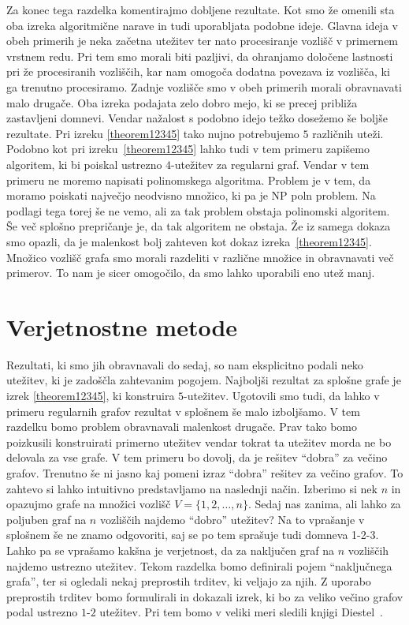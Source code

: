 \documentclass[12pt,a4paper,twoside]{article}
\theoremstyle{definition} %
\theoremstyle{plain} %
\numberwithin{equation}{section}  %
\begin{document}
Za konec tega razdelka komentirajmo dobljene rezultate. Kot smo že omenili sta oba izreka algoritmične narave in tudi uporabljata podobne ideje. Glavna ideja v obeh primerih je neka začetna utežitev ter nato procesiranje vozlišč v primernem vrstnem redu. Pri tem smo morali biti pazljivi, da ohranjamo določene lastnosti pri že procesiranih vozliščih, kar nam omogoča dodatna povezava iz vozlišča, ki ga trenutno procesiramo. Zadnje vozlišče smo v obeh primerih morali obravnavati malo drugače. Oba izreka podajata zelo dobro mejo, ki se precej približa zastavljeni domnevi. Vendar nažalost s podobno idejo težko dosežemo še boljše rezultate. Pri izreku \ref{theorem12345} tako nujno potrebujemo $5$ različnih uteži. Podobno kot pri izreku~\ref{theorem12345} lahko tudi v tem primeru zapišemo algoritem, ki bi poiskal ustrezno $4$-utežitev za regularni graf. Vendar v tem primeru ne moremo napisati polinomskega algoritma. Problem je v tem, da moramo poiskati največjo neodvisno množico, ki pa je NP poln problem. Na podlagi tega torej še ne vemo, ali za tak problem obstaja polinomski algoritem. Še več splošno prepričanje je, da tak algoritem ne obstaja. Že iz samega dokaza smo opazli, da je malenkost bolj zahteven kot dokaz izreka~\ref{theorem12345}. Množico vozlišč grafa smo morali razdeliti v različne množice in obravnavati več primerov. To nam je sicer omogočilo, da smo lahko uporabili eno utež manj.	
 
 \section{Verjetnostne metode}

Rezultati, ki smo jih obravnavali do sedaj, so nam eksplicitno podali neko utežitev, ki je zadoščla zahtevanim pogojem. Najboljši rezultat za splošne grafe je izrek \ref{theorem12345}, ki konstruira $5$-utežitev. Ugotovili smo tudi, da lahko v primeru regularnih grafov rezultat v splošnem še malo izboljšamo. V tem razdelku bomo problem obravnavali malenkost drugače. Prav tako bomo poizkusili konstruirati primerno utežitev vendar tokrat ta utežitev morda ne bo delovala za vse grafe. V tem primeru bo dovolj, da je rešitev ``dobra'' za večino grafov. Trenutno še ni jasno kaj pomeni izraz ``dobra'' rešitev za večino grafov. To zahtevo si lahko intuitivno predstavljamo na naslednji način. Izberimo si nek $n$ in opazujmo grafe na množici vozlišč $V = \{1,2, \ldots, n\}$. Sedaj nas zanima, ali lahko za poljuben graf na $n$ vozliščih najdemo ``dobro'' utežitev? Na to vprašanje v splošnem še ne znamo odgovoriti, saj se po tem sprašuje tudi domneva 1-2-3. Lahko pa se vprašamo kakšna je verjetnost, da za naključen graf na $n$ vozliščih najdemo ustrezno utežitev. Tekom razdelka bomo definirali pojem ``naključnega grafa'', ter si ogledali nekaj preprostih trditev, ki veljajo za njih. Z uporabo preprostih trditev bomo formulirali in dokazali izrek, ki bo za veliko večino grafov podal ustrezno $1$-$2$ utežitev. Pri tem bomo v veliki meri sledili knjigi Diestel~\cite{maingraph}.
\end{document}
